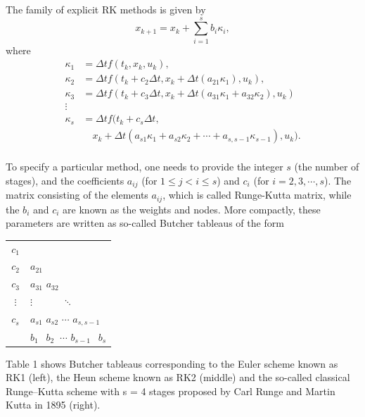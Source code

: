 The family of explicit RK methods is given by
\begin{equation}
	x_{k+1} = x_k +  \sum_{i=1}^s b_i \kappa_i,
\end{equation}
where
\begin{equation}
	\begin{split}
		\kappa_1 &= \Delta t f(t_k,x_k,u_k),\\
		\kappa_2 &= \Delta t f(t_k+c_2\Delta t, x_k+\Delta t(a_{21}\kappa_1),u_k),\\
		\kappa_3 &= \Delta t f(t_k+c_3\Delta t, x_k+\Delta t(a_{31}\kappa_1+a_{32}\kappa_2),u_k)\\
		\vdots\\
		\kappa_s &= \Delta t f(t_k+c_s\Delta t,\\&  \quad x_k+\Delta t(a_{s1}\kappa_1+a_{s2}\kappa_2+\cdots+a_{s,s-1}\kappa_{s-1}),u_k).
	\end{split}
\end{equation}
\\
To specify a particular method, one needs to provide the integer $s$ (the number of stages), and the coefficients $a_{ij}$ (for $1 \leq j <i \leq s$) and $c_i$ (for $i=2,3,\cdots,s$). The matrix consisting of the elements $a_{ij}$, which is called Runge-Kutta matrix, while the $b_i$ and $c_i$ are known as the weights and nodes. More compactly, these parameters are written as so-called Butcher tableaus\cite{grune2017nonlinear} of the form
\begin{table}[H]
  \begin{center}
  	\begin{tabular}{c|l}
  	$c_1$ &  \\
  	$c_2$ & $a_{21}$ \\
  	$c_3$ & $a_{31}$ $a_{32}$\\
  	$\vdots$ & $\vdots$ $\quad$ $\quad$ $\ddots$\\
  	$c_s$ & $a_{s1}$ $a_{s2}$ $\cdots$ $a_{s,s-1}$\\
  	\hline
  	$\quad$ & $b_1\ \ $ $b_2\ $ $\cdots$ $b_{s-1}\ \ $ $b_s$
  	\end{tabular}	
  \end{center}
\end{table}
Table 1 shows Butcher tableaus corresponding to the Euler scheme known as RK1 (left), the Heun scheme known as RK2 (middle) and the so-called classical Runge–Kutta scheme with s = 4 stages proposed by Carl Runge and Martin Kutta in 1895 (right).
